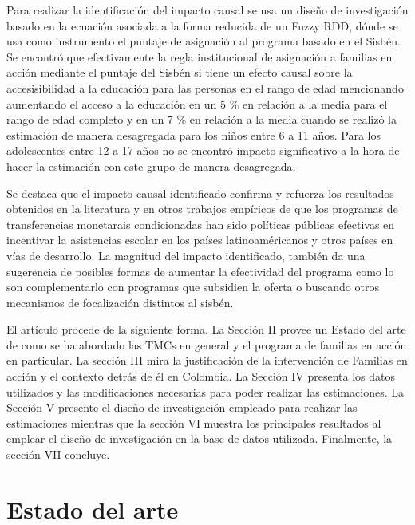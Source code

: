 \documentclass[AER]{AEA}
\begin{document}
Para realizar la identificación del impacto causal se usa un diseño de investigación basado en la ecuación asociada a la forma reducida de un Fuzzy RDD, dónde se usa como instrumento el puntaje de asignación al programa basado en el Sisbén. Se encontró que efectivamente la regla institucional de asignación a familias en acción mediante el puntaje del Sisbén si tiene un efecto causal sobre la accesisibilidad a la educación para las personas en el rango de edad mencionando aumentando el acceso a la educación en un 5 \% en relación a la media para el rango de edad completo y en un 7 \% en relación a la media cuando se realizó la estimación de manera desagregada para los niños entre 6 a 11 años. Para los adolescentes entre 12 a 17 años no se encontró impacto significativo a la hora de hacer la estimación con este grupo de manera desagregada. 

Se destaca que el impacto causal identificado confirma y refuerza los resultados obtenidos en la literatura y en otros trabajos empíricos de que los programas de transferencias monetarais condicionadas han sido políticas públicas efectivas en incentivar la asistencias escolar en los países latinoaméricanos y otros países en vías de desarrollo. La magnitud del impacto identificado, también da una sugerencia de posibles formas de aumentar la efectividad del programa como lo son complementarlo con programas que subsidien la oferta o buscando otros mecanismos de focalización distintos al sisbén. 

El artículo procede de la siguiente forma. La Sección II provee un Estado del arte de como se ha abordado las TMCs en general y el programa de familias en acción en particular. La sección III mira la justificación de la intervención de Familias en acción y el contexto detrás de él en Colombia. La Sección IV presenta los datos utilizados y las modificaciones necesarias para poder realizar las estimaciones. La Sección V presente el diseño de investigación empleado para realizar las estimaciones mientras que la sección VI muestra los principales resultados al emplear el diseño de investigación en la base de datos utilizada. Finalmente, la sección VII concluye. 

\section{Estado del arte}
\end{document}
